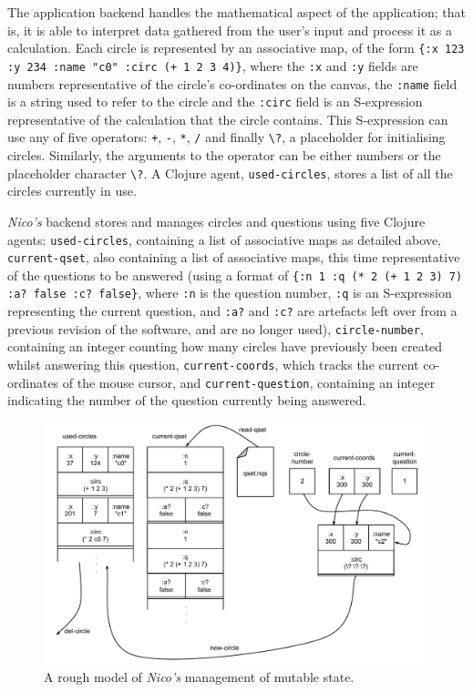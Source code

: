 \documentclass[12pt,twoside,notitlepage,xetex]{report}
\begin{document}
The application backend handles the mathematical aspect of the application;
that is, it is able to interpret data gathered from the user's input and
process it as a calculation.  Each circle is represented by an associative map,
of the form \verb¬{:x 123 :y 234 :name "c0" :circ (+ 1 2 3 4)}¬, where the
\verb¬:x¬ and \verb¬:y¬ fields are numbers representative of the circle's
co-ordinates on the canvas, the \verb¬:name¬ field is a string used to refer to
the circle and the \verb¬:circ¬ field is an S-expression representative of the
calculation that the circle contains.  This S-expression can use any of five
operators: \verb¬+¬, \verb¬-¬, \verb¬*¬, \verb¬/¬ and finally \verb¬\?¬, a
placeholder for initialising circles.  Similarly, the arguments to the operator
can be either numbers or the placeholder character \verb¬\?¬.  A Clojure agent,
\verb¬used-circles¬,  stores a list of all the circles currently in use.

\emph{Nico's} backend stores and manages circles and questions using five
Clojure agents: \verb¬used-circles¬, containing a list of associative maps as
detailed above, \verb¬current-qset¬, also containing a list of associative
maps, this time representative of the questions to be answered (using a format
of \verb¬{:n 1 :q (* 2 (+ 1 2 3) 7) :a? false :c? false}¬, where \verb¬:n¬ is
the question number, \verb¬:q¬ is an S-expression representing the current
question, and \verb¬:a?¬ and \verb¬:c?¬ are artefacts left over from a previous
revision of the software, and are no longer used), \verb¬circle-number¬,
containing an integer counting how many circles have previously been created
whilst answering this question, \verb¬current-coords¬, which tracks the current
co-ordinates of the mouse cursor, and \verb¬current-question¬, containing an
integer indicating the number of the question currently being answered.

\begin{center}
\begin{figure}[H]
\begin{center}
\includegraphics[width=\textwidth-2cm]{figs/nico_backend.pdf}
\end{center}
\caption{A rough model of \emph{Nico's} management of mutable state.}
\end{figure}
\end{center}
\end{document}
